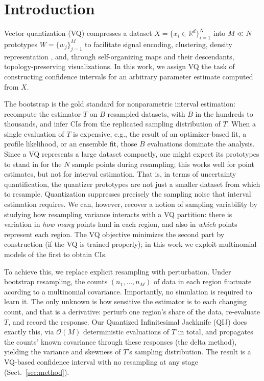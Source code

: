 \documentclass[runningheads]{llncs}
\begin{document}
\section{Introduction}\label{sec:intro}

Vector quantization (VQ) compresses a dataset $X = \{x_i \in \mathbb{R}^d\}_{i=1}^N$ into $M \ll N$ prototypes $W = \{w_j\}_{j=1}^M$ to facilitate signal encoding, clustering, density representation \cite{graf2000}, and, through self-organizing maps and their descendants, topology-preserving visualizations. In this work, we assign VQ the task of constructing confidence intervals for an arbitrary parameter estimate  computed from $X$.

The bootstrap \cite{efron1979} is the gold standard for nonparametric interval estimation: recompute the estimator $T$ on $B$ resampled datasets, with $B$ in the hundreds to thousands, and infer CIs from the replicated sampling distribution of $T$. When a single evaluation of $T$ is expensive, e.g., the result of an optimizer-based fit, a profile likelihood, or an ensemble fit, those $B$ evaluations dominate the analysis. Since a VQ represents a large dataset compactly, one might expect its prototypes to stand in for the $N$ sample points during resampling; this works well for point estimates, but not for interval estimation. That is, in terms of uncertainty quantification, the quantizer prototypes are not just a smaller dataset from which to resample. Quantization suppresses precisely the sampling noise that interval estimation requires. We can, however, recover a notion of sampling variability by studying how resampling variance interacts with a VQ partition: there is variation in \emph{how many} points land in each region, and also in \emph{which} points represent each region. The VQ objective minimizes the second part by construction (if the VQ is trained properly); in this work we exploit multinomial models of the first to obtain CIs.

To achieve this, we replace explicit resampling with perturbation. Under bootstrap resampling, the counts $(n_1,\dots,n_M)$ of data in each region fluctuate acording to a multinomial covariance. Importantly, no simulation is required to learn it. The only unknown is how sensitive the estimator is to each changing count, and that is a derivative: perturb one region's share of the data, re-evaluate $T$, and record the response. Our Quantized Infinitesimal Jackknife (QIJ) does exactly this, via $\mathcal{O}(M)$ deterministic evaluations of $T$ in total, and propagates the counts' known covariance through these responses (the delta method), yielding the variance and skewness of $T$'s sampling distribution. The result is a VQ-based confidence interval with no resampling at any stage (Sect.~\ref{sec:method}).
\end{document}
